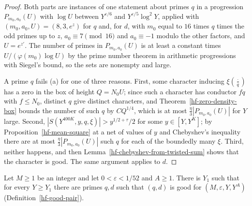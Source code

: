 \begin{proof}
Both parts are instances of one statement about primes $q$ in a progression $P_{m_0,a_0}(U)$ with
$\log U$ between $Y^{\varepsilon/6}$ and $Y^{\varepsilon/5}\log^2Y$, applied with
$(m_0,a_0,U)=(8,3,e^z)$ for $q$ and, for $d$, with $m_0$ equal to $16$ times $q$ times the odd
primes up to $z$, $a_0\equiv7\pmod{16}$ and $a_0\equiv-1$ modulo the other factors, and $U=e^{z'}$.
The number of primes in $P_{m_0,a_0}(U)$ is at least a constant times $U/(\varphi(m_0)\log U)$ by
the prime number theorem in arithmetic progressions with Siegel's bound, so the sets are nonempty
and large.

A prime $q$ fails (a) for one of three reasons. First, some character inducing
$\xi\left(\frac{\cdot}{q}\right)$ has a zero in the box of height $Q=N_0U$; since such a character has
conductor $fq$ with $f\leq N_0$, distinct $q$ give distinct characters, and
Theorem~\ref{hf-zero-density-box} bounds the number of such $q$ by $CQ^{1/4}$, which is at most
$\frac\eta3|P_{m_0,a_0}(U)|$ for $Y$ large. Second, $|S(Y^{400K},y,q,\xi)|>y^{1/2+\tau}/2$ for some
$y\in[Y,Y^K]$; by Proposition~\ref{hf-mean-square} at a net of values of $y$ and Chebyshev's
inequality there are at most $\frac\eta3|P_{m_0,a_0}(U)|$ such $q$ for each of the boundedly many
$\xi$. Third, neither happens, and then Lemma~\ref{hf-chebyshev-from-twisted-sum} shows that the
character is good. The same argument applies to $d$.
\end{proof}

\begin{theorem}\label{hf-good-pairs-exist}
Let $M\geq1$ be an integer and let $0<\varepsilon<1/52$ and $A\geq1$. There is $Y_1$ such that for
every $Y\geq Y_1$ there are primes $q,d$ such that $(q,d)$ is good for $(M,\varepsilon,Y,Y^A)$
(Definition~\ref{hf-good-pair}).
\end{theorem}

